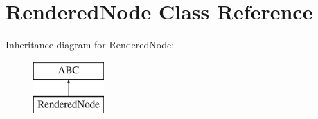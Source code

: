 \hypertarget{class_rendering_stub_1_1_rendered_node}{}\section{Rendered\+Node Class Reference}
\label{class_rendering_stub_1_1_rendered_node}
Inheritance diagram for Rendered\+Node\+:\begin{figure}[H]
\begin{center}
\leavevmode
\includegraphics[height=2.000000cm]{class_rendering_stub_1_1_rendered_node}
\end{center}
\end{figure}

